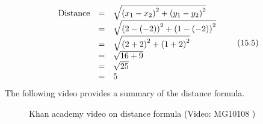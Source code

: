     \begin{equation}
    \begin{array}{ccc}\hfill \mathrm{Distance}& =& \sqrt{{\left({x}_{1}-{x}_{2}\right)}^{2}+{\left({y}_{1}-{y}_{2}\right)}^{2}}\hfill \\ & =& \sqrt{{\left(2-\left(-2\right)\right)}^{2}+{\left(1-\left(-2\right)\right)}^{2}}\hfill \\ & =& \sqrt{{\left(2+2\right)}^{2}+{\left(1+2\right)}^{2}}\hfill \\ & =& \sqrt{16+9}\hfill \\ & =& \sqrt{25}\hfill \\ & =& 5\hfill \end{array}\tag{15.5}
      \end{equation}
        \label{m39107*eip-130}The following video provides a summary of the distance formula.
    \setcounter{subfigure}{0}
	\begin{figure}[H] %
    \textnormal{Khan academy video on distance formula}\vspace{.1in} \nopagebreak
  \label{m39107*yt-media}\label{m39107*yt-video}
             { (Video:  MG10108 )}
      \vspace{2pt}
    \vspace{.1in}
 \end{figure}       \par 
      \label{m39107**end}
%     
%     
%     
      \label{m39108*uid40}
